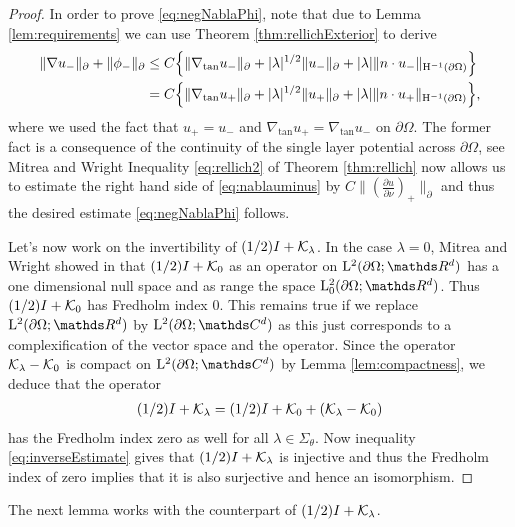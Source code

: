 \begin{proof}
  In order to prove \eqref{eq:negNablaPhi}, note that due to Lemma \ref{lem:requirements} we can use Theorem \ref{thm:rellichExterior} to derive
  \begin{align}
    \|\nabla u_-\|_\partial + \|\phi_-\|_\partial
    &\leq C \Big\{ \|\nabla_{\mathrm{tan}} u_- \|_\partial + |\lambda|^{1/2} \| u_-\|_\partial + |\lambda| \| n \cdot u_-\|_{\mathrm{H}^{-1}(\partial\Omega)} \Big\} \nonumber\\
    \label{eq:nablauminus}
    &= C \Big\{ \|\nabla_{\mathrm{tan}} u_+ \|_\partial + |\lambda|^{1/2} \| u_+ \|_\partial + |\lambda| \|n \cdot u_+ \|_{\mathrm{H}^{-1}(\partial\Omega)} \Big\},
  \end{align}
  where we used the fact that $u_+ = u_-$ and $\nabla_{\mathrm{tan}} u_+ = \nabla_{\mathrm{tan}} u_-$ on $\partial\Omega$. The former fact is a consequence of the continuity of the single layer potential across $\partial\Omega$, see Mitrea and Wright \cite[Prop. 4.7]{mitreaWright}
  Inequality \eqref{eq:rellich2} of Theorem \ref{thm:rellich} now allows us to estimate the right hand side of \eqref{eq:nablauminus} by $C \|(\frac{\partial u}{\partial \nu} )_+ \|_\partial$ and thus the desired estimate \eqref{eq:negNablaPhi} follows.

  Let's now work on the invertibility of $(1/2) I + \mathcal{K}_\lambda$. In the case $\lambda = 0$, Mitrea and Wright showed in \cite[Eq. (5.166)]{mitreaWright} that $(1/2) I + \mathcal{K}_0$ as an operator on $\Ell^2(\partial\Omega; \R^d)$ has a one dimensional null space and as range the space $\Ell_0^2(\partial\Omega; \R^d)$.
  Thus $(1/2) I + \mathcal{K}_0$ has Fredholm index $0$.
  This remains true if we replace $\Ell^2(\partial\Omega; \R^d)$ by $\Ell^2(\partial\Omega; \C^d)$ as this just corresponds to a complexification of the vector space and the operator. 
  Since the operator $\mathcal{K}_\lambda - \mathcal{K}_0$ is compact on $\Ell^2(\partial\Omega; \C^d)$ by Lemma \ref{lem:compactness}, we deduce that the operator
  \begin{align*}
    (1/2)I + \mathcal{K}_\lambda = (1/2)I + \mathcal{K}_0 + (\mathcal{K}_\lambda - \mathcal{K}_0)
  \end{align*}
  has the Fredholm index zero as well for all $\lambda \in \Sigma_\theta$.
  Now inequality \eqref{eq:inverseEstimate} gives that $(1/2)I + \mathcal{K}_\lambda$ is injective and thus the Fredholm index of zero implies that it is also surjective and hence an isomorphism.
\end{proof}

The next lemma works with the counterpart of $(1/2)I + \mathcal{K}_\lambda$.

